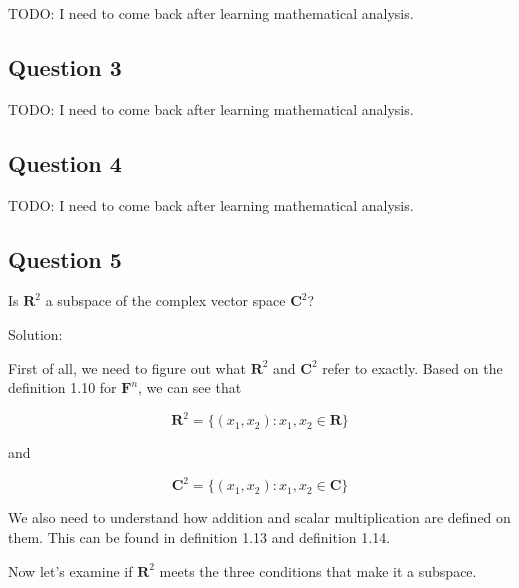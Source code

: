 \documentclass[12pt, letterpaper, oneside]{book}
\begin{document}
TODO: I need to come back after learning mathematical analysis.

\subsection{Question 3}

TODO: I need to come back after learning mathematical analysis.

\subsection{Question 4}

TODO: I need to come back after learning mathematical analysis.

\subsection{Question 5}

Is $\mathbf{R}^2$ a subspace of the complex vector space $\mathbf{C}^2$?

Solution:

First of all, we need to figure out what $\mathbf{R}^2$ and $\mathbf{C}^2$
refer to exactly. Based on the definition 1.10 for $\mathbf{F}^n$, we can see
that

\[
  \mathbf{R}^2 = \{(x_1, x_2): x_1, x_2 \in \mathbf{R} \}
\]

and

\[
  \mathbf{C}^2 = \{(x_1, x_2): x_1, x_2 \in \mathbf{C} \}
\]

We also need to understand how addition and scalar multiplication are defined
on them. This can be found in definition 1.13 and definition 1.14.

Now let's examine if $\mathbf{R}^2$ meets the three conditions that make it a
subspace.
\end{document}
